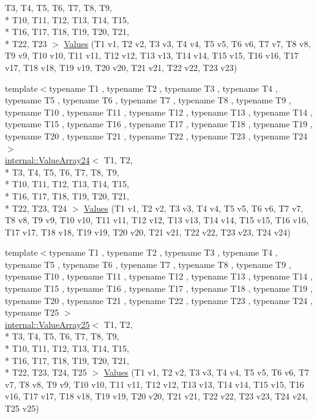 \begin{DoxyCompactItemize}
T3, T4, T5, T6, T7, T8, T9, \\*
T10, T11, T12, T13, T14, T15, \\*
T16, T17, T18, T19, T20, T21, \\*
T22, T23 $>$ \hyperlink{namespacetesting_a820991f1c28518a0c218176bd7192de8}{Values} (T1 v1, T2 v2, T3 v3, T4 v4, T5 v5, T6 v6, T7 v7, T8 v8, T9 v9, T10 v10, T11 v11, T12 v12, T13 v13, T14 v14, T15 v15, T16 v16, T17 v17, T18 v18, T19 v19, T20 v20, T21 v21, T22 v22, T23 v23)
\item 
{\footnotesize template$<$typename T1 , typename T2 , typename T3 , typename T4 , typename T5 , typename T6 , typename T7 , typename T8 , typename T9 , typename T10 , typename T11 , typename T12 , typename T13 , typename T14 , typename T15 , typename T16 , typename T17 , typename T18 , typename T19 , typename T20 , typename T21 , typename T22 , typename T23 , typename T24 $>$ }\\\hyperlink{classtesting_1_1internal_1_1ValueArray24}{internal\-::\-Value\-Array24}$<$ T1, T2, \\*
T3, T4, T5, T6, T7, T8, T9, \\*
T10, T11, T12, T13, T14, T15, \\*
T16, T17, T18, T19, T20, T21, \\*
T22, T23, T24 $>$ \hyperlink{namespacetesting_a74b2375fe8c3c685e6f7b0b6a9b61009}{Values} (T1 v1, T2 v2, T3 v3, T4 v4, T5 v5, T6 v6, T7 v7, T8 v8, T9 v9, T10 v10, T11 v11, T12 v12, T13 v13, T14 v14, T15 v15, T16 v16, T17 v17, T18 v18, T19 v19, T20 v20, T21 v21, T22 v22, T23 v23, T24 v24)
\item 
{\footnotesize template$<$typename T1 , typename T2 , typename T3 , typename T4 , typename T5 , typename T6 , typename T7 , typename T8 , typename T9 , typename T10 , typename T11 , typename T12 , typename T13 , typename T14 , typename T15 , typename T16 , typename T17 , typename T18 , typename T19 , typename T20 , typename T21 , typename T22 , typename T23 , typename T24 , typename T25 $>$ }\\\hyperlink{classtesting_1_1internal_1_1ValueArray25}{internal\-::\-Value\-Array25}$<$ T1, T2, \\*
T3, T4, T5, T6, T7, T8, T9, \\*
T10, T11, T12, T13, T14, T15, \\*
T16, T17, T18, T19, T20, T21, \\*
T22, T23, T24, T25 $>$ \hyperlink{namespacetesting_a74baf6524bda9b5799e313541b4816ea}{Values} (T1 v1, T2 v2, T3 v3, T4 v4, T5 v5, T6 v6, T7 v7, T8 v8, T9 v9, T10 v10, T11 v11, T12 v12, T13 v13, T14 v14, T15 v15, T16 v16, T17 v17, T18 v18, T19 v19, T20 v20, T21 v21, T22 v22, T23 v23, T24 v24, T25 v25)

\end{DoxyCompactItemize}
